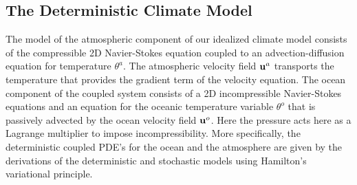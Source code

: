 \documentclass[11pt, oneside]{article}   	%
\numberwithin{equation}{section}
\theoremstyle{plain}
\theoremstyle{definition}
\theoremstyle{remark}
\newcommand{\<}{\langle}
\renewcommand{\>}{\rangle}
\def\U{{\bf u}}
\begin{document}
%
 \subsection{The Deterministic Climate Model}\label{subsect_DetModel}
The model of the atmospheric component of our idealized climate model consists of  the compressible 2D Navier-Stokes equation coupled to an advection-diffusion equation for  temperature $\theta^a$. The atmospheric velocity field $\U^a$ transports the temperature that provides the gradient term of the velocity equation. The ocean component of the coupled system consists of a 2D incompressible Navier-Stokes equations and an equation for the oceanic temperature variable $\theta^o$ that is passively advected by the ocean velocity field $\U^o$. Here the pressure acts here as a Lagrange multiplier to impose incompressibility. More specifically, the deterministic coupled PDE's for the ocean and the atmosphere are given by
the derivations of the deterministic and stochastic models using Hamilton's variational principle. 
\end{document}
